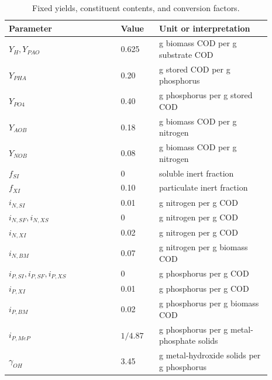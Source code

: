 \begin{table}[htbp]
\centering\small
\caption{Fixed yields, constituent contents, and conversion factors.}\label{tab:plant_stoichiometric_constants}
\begin{tabular}{p{0.38\linewidth}p{0.13\linewidth}p{0.38\linewidth}}
\toprule Parameter & Value & Unit or interpretation\\\midrule
$Y_H,Y_{PAO}$ & 0.625 & g biomass COD per g substrate COD\\
$Y_{PHA}$ & 0.20 & g stored COD per g phosphorus\\
$Y_{PO4}$ & 0.40 & g phosphorus per g stored COD\\
$Y_{AOB}$ & 0.18 & g biomass COD per g nitrogen\\
$Y_{NOB}$ & 0.08 & g biomass COD per g nitrogen\\
$f_{SI}$ & 0 & soluble inert fraction\\
$f_{XI}$ & 0.10 & particulate inert fraction\\
$i_{N,SI}$ & 0.01 & g nitrogen per g COD\\
$i_{N,SF},i_{N,XS}$ & 0 & g nitrogen per g COD\\
$i_{N,XI}$ & 0.02 & g nitrogen per g COD\\
$i_{N,BM}$ & 0.07 & g nitrogen per g biomass COD\\
$i_{P,SI},i_{P,SF},i_{P,XS}$ & 0 & g phosphorus per g COD\\
$i_{P,XI}$ & 0.01 & g phosphorus per g COD\\
$i_{P,BM}$ & 0.02 & g phosphorus per g biomass COD\\
$i_{P,MeP}$ & $1/4.87$ & g phosphorus per g metal-phosphate solids\\
$\gamma_{OH}$ & 3.45 & g metal-hydroxide solids per g phosphorus\\
\bottomrule
\end{tabular}
\end{table}

